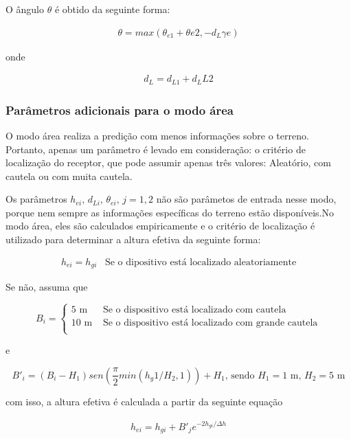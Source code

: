 O ângulo $\theta$ é obtido da seguinte forma:

\begin{align}
\label{theta} \theta = max(\theta_{e1} + \theta{e2}, -d_{L} \gamma e)
\end{align}

onde

\begin{align}
\label{dl} d_L = d_{L1} + d_L{L2}
\end{align}

\subsubsection{Parâmetros adicionais para o modo área}

O modo área realiza a predição com menos informações sobre o terreno. Portanto, apenas um parâmetro é levado em consideração: o critério de localização do receptor, que pode assumir apenas três valores: Aleatório, com cautela ou com muita cautela.

Os parâmetros \begin{math}h_{ei}, \, d_{Li}, \, \theta_{ei}, \, j=1,2\end{math} não são parâmetos de entrada nesse modo, porque nem sempre as informações específicas do terreno estão disponíveis.No modo área, eles são calculados empiricamente e o critério de localização é utilizado para determinar a altura efetiva da seguinte forma:

\begin{align}
\label{h_ei} h_{ei} = h_{gi} \,\,\,\,\, \text{Se o dipositivo está localizado aleatoriamente}
\end{align}

Se não, assuma que

\[ B_i = \begin{cases} 
      5 \text{ m} & \textrm{ Se o dispositivo está localizado com cautela} \\
      10 \text{ m} & \textrm{ Se o dispositivo está localizado com grande cautela} \\
   \end{cases} \]  
   
e

\[ B'_i = (B_i - H_1)sen(\frac{\pi}{2} min(h_g1/H_2,1)) + H_1 \textrm{, sendo $H_1 = 1$ m, $H_2 = 5$ m} \]

com isso, a altura efetiva é calculada a partir da seguinte equação

\begin{align} 
\label{hei} h_{ei} = h_{gi} + B'_je^{-2h_{gi}/\Delta h}
\end{align}


